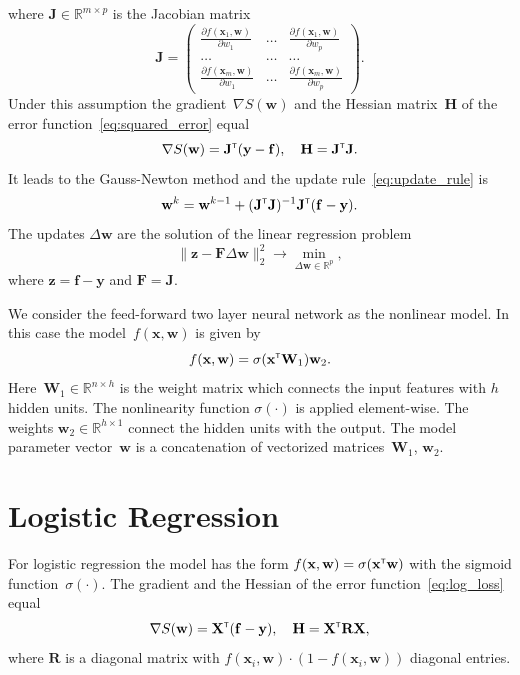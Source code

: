 \documentclass[a4paper,12pt]{article}
\theoremstyle{plain} %
\theoremstyle{definition} %
\theoremstyle{remark} %
\newcommand{\bw}{\mathbf{w}}
\newcommand{\by}{\mathbf{y}}
\newcommand{\bx}{\mathbf{x}}
\newcommand{\bz}{\mathbf{z}}
\newcommand{\bJ}{\mathbf{J}}
\newcommand{\bbR}{\mathbb{R}}
\newcommand{\bW}{\mathbf{W}}
\newcommand{\bH}{\mathbf{H}}
\newcommand{\bF}{\mathbf{F}}
\newcommand{\bR}{\mathbf{R}}
\newcommand{\bX}{\mathbf{X}}
\newcommand{\T}{{\text{\tiny\sffamily\upshape\mdseries T}}}
\begin{document}
	where $\mathbf{J} \in \bbR^{m \times p}$ is the Jacobian matrix
	\begin{equation}
		\bJ = 
		\begin{pmatrix}
		\frac{\partial f(\bx_1 , \bw)}{\partial w_1} & \dots & 
		\frac{\partial f(\bx_1 , \bw)}{\partial w_p} \\
		\dots & \dots & \dots \\
		\frac{\partial f(\bx_m , \bw)}{\partial w_1} & \dots & 
		\frac{\partial f(\bx_m , \bw)}{\partial w_p}
		\end{pmatrix}.
	\end{equation}
	Under this assumption the gradient~$\nabla S(\bw)$ and the Hessian matrix~$\bH$ of the error function~\eqref{eq:squared_error} equal
	\begin{equation}
		\nabla S(\bw) = \bJ^{\T} (\by - \mathbf{f}), \quad \bH = \bJ^{\T} \bJ.
		\label{eq:nonlin_reg_deriv}
	\end{equation}
	It leads to the Gauss-Newton method and the update rule~\eqref{eq:update_rule} is 
	\[
		\bw^k = \bw^{k - 1} + (\bJ^{\T} \bJ)^{-1}\bJ^{\T}(\mathbf{f} - \by).
	\]
	The updates $\Delta \bw$ are the solution of the linear regression problem
	\begin{equation}
		\| \bz - \bF \Delta \bw \|_2^2 \rightarrow \min_{\Delta \bw \in \bbR^{p}},
		\label{eq:lin_reg_nonlin_reg}
	\end{equation}
	where $\bz = \mathbf{f} - \by$ and $\bF = \bJ$.
	
	We consider the feed-forward two layer neural network as the nonlinear model. In this case the model~$f(\bx, \bw)$ is given by
	\[
	f(\bx, \bw) = \sigma(\bx^{\T} \bW_1) \bw_2.
	\]
	Here~$\bW_1 \in \bbR^{n \times h}$ is the weight matrix which connects the input features with $h$ hidden units. The nonlinearity function $\sigma(\cdot)$ is applied element-wise. The weights $\bw_2 \in \bbR^{h \times 1}$ connect the hidden units with the output. 
	The model parameter vector~$\bw$ is a concatenation of vectorized matrices~$\bW_1$, $\bw_2$.
	
	\section*{Logistic Regression}
	For logistic regression the model has the form $f(\bx , \bw) = \sigma(\bx^{\T} \bw)$ with the sigmoid function~$\sigma(\cdot)$.
	The gradient and the Hessian of the error function~\eqref{eq:log_loss} equal
	\begin{equation}
		\nabla S(\bw) = \bX^{\T} (\mathbf{f} - \by), \quad \bH = \bX^{\T} \bR \bX,
		\label{eq:log_reg_deriv}
	\end{equation}
	where $\bR$ is a diagonal matrix with $f(\bx_i , \bw) \cdot (1 - f(\bx_i , \bw))$ diagonal entries.
	
\end{document}
